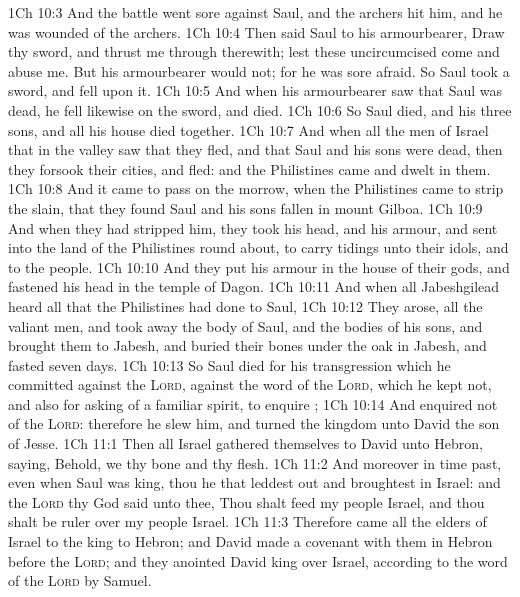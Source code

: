 \vs 1Ch 10:3 And the battle went sore against Saul, and the archers hit him, and he was wounded of the archers.
\vs 1Ch 10:4 Then said Saul to his armourbearer, Draw thy sword, and thrust me through therewith; lest these uncircumcised come and abuse me. But his armourbearer would not; for he was sore afraid. So Saul took a sword, and fell upon it.
\vs 1Ch 10:5 And when his armourbearer saw that Saul was dead, he fell likewise on the sword, and died.
\vs 1Ch 10:6 So Saul died, and his three sons, and all his house died together.
\vs 1Ch 10:7 And when all the men of Israel that  in the valley saw that they fled, and that Saul and his sons were dead, then they forsook their cities, and fled: and the Philistines came and dwelt in them.
\vs 1Ch 10:8 And it came to pass on the morrow, when the Philistines came to strip the slain, that they found Saul and his sons fallen in mount Gilboa.
\vs 1Ch 10:9 And when they had stripped him, they took his head, and his armour, and sent into the land of the Philistines round about, to carry tidings unto their idols, and to the people.
\vs 1Ch 10:10 And they put his armour in the house of their gods, and fastened his head in the temple of Dagon.
\vs 1Ch 10:11 And when all Jabeshgilead heard all that the Philistines had done to Saul,
\vs 1Ch 10:12 They arose, all the valiant men, and took away the body of Saul, and the bodies of his sons, and brought them to Jabesh, and buried their bones under the oak in Jabesh, and fasted seven days.
\vs 1Ch 10:13 So Saul died for his transgression which he committed against the \textsc{Lord},  against the word of the \textsc{Lord}, which he kept not, and also for asking  of  a familiar spirit, to enquire ;
\vs 1Ch 10:14 And enquired not of the \textsc{Lord}: therefore he slew him, and turned the kingdom unto David the son of Jesse.
\vs 1Ch 11:1 Then all Israel gathered themselves to David unto Hebron, saying, Behold, we  thy bone and thy flesh.
\vs 1Ch 11:2 And moreover in time past, even when Saul was king, thou  he that leddest out and broughtest in Israel: and the \textsc{Lord} thy God said unto thee, Thou shalt feed my people Israel, and thou shalt be ruler over my people Israel.
\vs 1Ch 11:3 Therefore came all the elders of Israel to the king to Hebron; and David made a covenant with them in Hebron before the \textsc{Lord}; and they anointed David king over Israel, according to the word of the \textsc{Lord} by Samuel.
